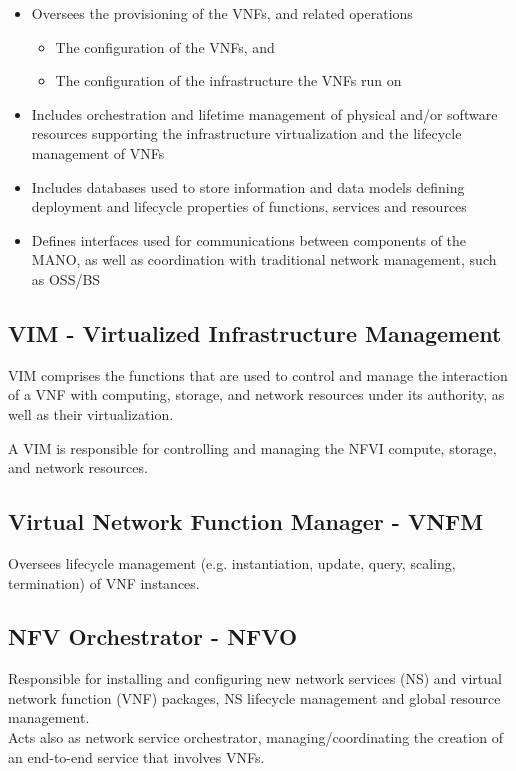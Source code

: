 \begin{itemize}
   \item Oversees the provisioning of the VNFs,
   and related operations
   \begin{itemize}
      \item The configuration of the VNFs, and
      \item The configuration of the infrastructure the VNFs run on
   \end{itemize}
   \item Includes orchestration and lifetime management of physical and/or software resources supporting the infrastructure virtualization and the lifecycle management of VNFs
   \item Includes databases used to store information and data models defining deployment and lifecycle properties of functions, services and resources
   \item Defines interfaces used for communications between components of the MANO, as well as coordination with traditional network management, such as OSS/BS
\end{itemize}

\subsection*{VIM - Virtualized Infrastructure
Management}
VIM comprises the functions that are used to control and manage the interaction of a VNF with computing, storage, and network resources under its authority, as well as their virtualization.

A VIM is responsible for controlling and managing the NFVI compute, storage, and network resources. 

\subsection*{Virtual Network Function
Manager - VNFM}
Oversees lifecycle management (e.g. instantiation, update, query, scaling, termination) of VNF instances.

\subsection*{NFV Orchestrator - NFVO}
Responsible for installing and configuring new network services (NS) and virtual network function (VNF) packages, NS lifecycle management and global resource management.\\
Acts also as network service orchestrator, managing/coordinating the creation of an end-to-end service that involves VNFs.